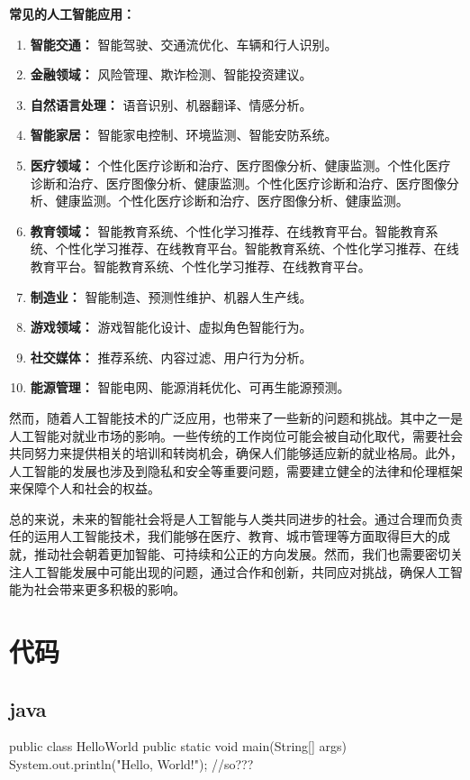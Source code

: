 \documentclass[11pt, a4paper, oneside]{ctexbook}
\begin{document}
\textbf{常见的人工智能应用：}
\begin{enumerate}
    \item \textbf{智能交通：} 智能驾驶、交通流优化、车辆和行人识别。
    \item \textbf{金融领域：} 风险管理、欺诈检测、智能投资建议。
    \item \textbf{自然语言处理：} 语音识别、机器翻译、情感分析。
    \item \textbf{智能家居：} 智能家电控制、环境监测、智能安防系统。
    \item \textbf{医疗领域：} 个性化医疗诊断和治疗、医疗图像分析、健康监测。个性化医疗诊断和治疗、医疗图像分析、健康监测。个性化医疗诊断和治疗、医疗图像分析、健康监测。个性化医疗诊断和治疗、医疗图像分析、健康监测。
    \item \textbf{教育领域：} 智能教育系统、个性化学习推荐、在线教育平台。智能教育系统、个性化学习推荐、在线教育平台。智能教育系统、个性化学习推荐、在线教育平台。智能教育系统、个性化学习推荐、在线教育平台。
    \item \textbf{制造业：} 智能制造、预测性维护、机器人生产线。
    \item \textbf{游戏领域：} 游戏智能化设计、虚拟角色智能行为。
    \item \textbf{社交媒体：} 推荐系统、内容过滤、用户行为分析。
    \item \textbf{能源管理：} 智能电网、能源消耗优化、可再生能源预测。
\end{enumerate}

然而，随着人工智能技术的广泛应用，也带来了一些新的问题和挑战。其中之一是人工智能对就业市场的影响。一些传统的工作岗位可能会被自动化取代，需要社会共同努力来提供相关的培训和转岗机会，确保人们能够适应新的就业格局。此外，人工智能的发展也涉及到隐私和安全等重要问题，需要建立健全的法律和伦理框架来保障个人和社会的权益。

总的来说，未来的智能社会将是人工智能与人类共同进步的社会。通过合理而负责任的运用人工智能技术，我们能够在医疗、教育、城市管理等方面取得巨大的成就，推动社会朝着更加智能、可持续和公正的方向发展。然而，我们也需要密切关注人工智能发展中可能出现的问题，通过合作和创新，共同应对挑战，确保人工智能为社会带来更多积极的影响。
\chapter{代码}
\section{java}
\begin{java}[caption=Java程序1]
public class HelloWorld {
    public static void main(String[] args) {
        System.out.println("Hello, World!");
        //so???
    }
}
\end{java}
\end{document}
